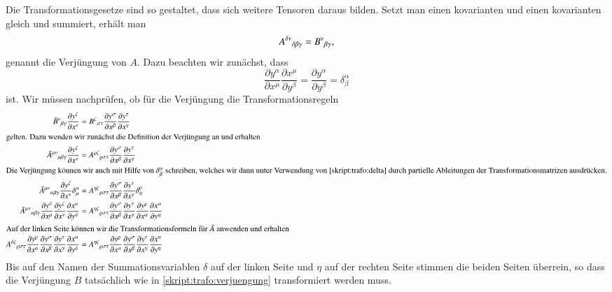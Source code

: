 Die Transformationsgesetze sind so gestaltet, dass sich weitere Tensoren
daraus bilden.
Setzt man einen kovarianten und einen kovarianten gleich und summiert,
erhält man
\[
A^{\delta\nu}\mathstrut_{\delta\beta\gamma}
=
B^\nu\mathstrut_{\beta\gamma},
\]
genannt die Verjüngung von $A$.
Dazu beachten wir zunächst, dass
\begin{equation}
\frac{\partial y^\alpha}{\partial x^\mu}
\frac{\partial x^\mu}{\partial y^\beta}
=
\frac{\partial y^\alpha}{\partial y^\beta}
=
\delta^\alpha_\beta
\label{skript:trafo:delta}
\end{equation}
ist.
Wir müssen nachprüfen, ob für die Verjüngung die Transformationsregeln
\begin{align}
\bar B^\nu\mathstrut_{\beta\gamma}
\frac{\partial y^\zeta}{\partial x^\nu}
&=
B^\zeta\mathstrut_{\sigma\tau}
\frac{\partial y^\sigma}{\partial x^\beta}
\frac{\partial y^\tau}{\partial x^\gamma}
\label{skript:trafo:verjuengung}
\\
\intertext{gelten. Dazu wenden wir zunächst die Definition der
Verjüngung an und erhalten}
\bar A^{\mu\nu}\mathstrut_{\mu\beta\gamma}
\frac{\partial y^\zeta}{\partial x^\nu}
&=
A^{\varrho\zeta}\mathstrut_{\varrho\sigma\tau}
\frac{\partial y^\sigma}{\partial x^\beta}
\frac{\partial y^\tau}{\partial x^\gamma}
\notag
\\
\intertext{Die Verjüngung können wir auch mit Hilfe von $\delta^\alpha_\beta$
schreiben, welches wir dann unter Verwendung von
\eqref{skript:trafo:delta}
durch partielle Ableitungen der Transformationsmatrizen
ausdrücken.}
\bar A^{\mu\nu}\mathstrut_{\alpha\beta\gamma}
\frac{\partial y^\zeta}{\partial x^\nu}
\delta_\mu^\alpha
&=
A^{\eta\zeta}\mathstrut_{\varrho\sigma\tau}
\frac{\partial y^\sigma}{\partial x^\beta}
\frac{\partial y^\tau}{\partial x^\gamma}
\delta^\varrho_\eta
\notag
\\
\bar A^{\mu\nu}\mathstrut_{\alpha\beta\gamma}
\frac{\partial y^\delta}{\partial x^\mu}
\frac{\partial y^\zeta}{\partial x^\nu}
\frac{\partial x^\alpha}{\partial y^\delta}
&=
A^{\eta\zeta}\mathstrut_{\varrho\sigma\tau}
\frac{\partial y^\sigma}{\partial x^\beta}
\frac{\partial y^\tau}{\partial x^\gamma}
\frac{\partial y^\varrho}{\partial x^\alpha}
\frac{\partial x^\alpha}{\partial y^\eta}
\notag
\\
\intertext{Auf der linken Seite können wir die Transformationsformeln
für $\bar A$ anwenden und erhalten}
A^{\delta\zeta}\mathstrut_{\varrho\sigma\tau}
\frac{\partial y^\varrho}{\partial x^\alpha}
\frac{\partial y^\sigma}{\partial x^\beta}
\frac{\partial y^\tau}{\partial x^\gamma}
\frac{\partial x^\alpha}{\partial y^\delta}
&=
A^{\eta\zeta}\mathstrut_{\varrho\sigma\tau}
\frac{\partial y^\varrho}{\partial x^\alpha}
\frac{\partial y^\sigma}{\partial x^\beta}
\frac{\partial y^\tau}{\partial x^\gamma}
\frac{\partial x^\alpha}{\partial y^\eta}
\notag
\end{align}
Bis auf den Namen der Summationsvariablen $\delta$ auf der linken
Seite und $\eta$ auf der rechten Seite stimmen die beiden Seiten 
überrein, so dass die Verjüngung $B$ tatsächlich wie in
\eqref{skript:trafo:verjuengung} transformiert werden muss.

